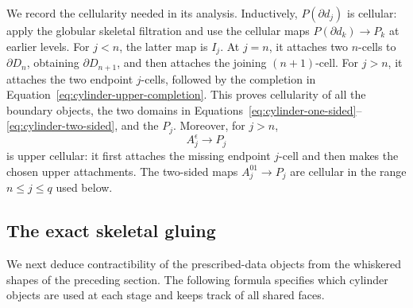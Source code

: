 \documentclass[11pt,letterpaper]{article}
\numberwithin{equation}{section}
\theoremstyle{plain}
\theoremstyle{definition}
\theoremstyle{remark}
\begin{document}
We record the cellularity needed in its analysis.  Inductively,
\(P(\partial d_j)\) is cellular: apply the globular skeletal
filtration and use the cellular maps
\(P(\partial d_k)\to P_k\) at earlier levels.  For \(j<n\),
the latter map is \(I_j\).  At \(j=n\), it attaches two
\(n\)-cells to \(\partial D_n\), obtaining
\(\partial D_{n+1}\), and then attaches the joining
\((n+1)\)-cell.  For \(j>n\), it attaches the two endpoint
\(j\)-cells, followed by the completion in
Equation~\eqref{eq:cylinder-upper-completion}.  This proves cellularity
of all the boundary objects, the two domains in
Equations~\eqref{eq:cylinder-one-sided}--\eqref{eq:cylinder-two-sided},
and the \(P_j\).  Moreover, for \(j>n\),
\begin{equation}\label{eq:cylinder-upper-one-sided}
                     A_j^\epsilon\longrightarrow P_j
\end{equation}
is upper cellular: it first attaches the missing endpoint \(j\)-cell
and then makes the chosen upper attachments.  The two-sided maps
\(A_j^{01}\to P_j\) are cellular in the range \(n\le j\le q\)
used below.

\subsection{The exact skeletal gluing}

We next deduce contractibility of the prescribed-data objects from the
whiskered shapes of the preceding section.  The following formula
specifies which cylinder objects are used at each stage and keeps track
of all shared faces.
\end{document}
